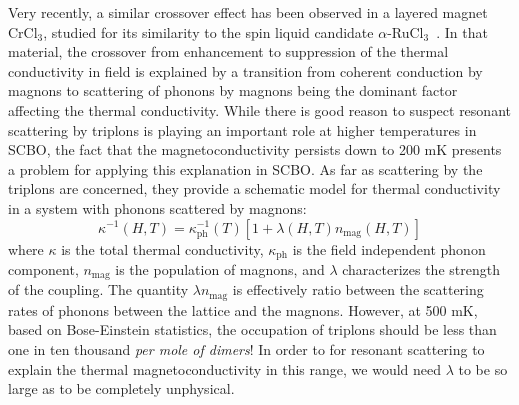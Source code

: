 \documentclass{thesis-umich}
\begin{document}
Very recently, a similar crossover effect has been observed in a layered magnet CrCl$_3$, studied for its similarity to the spin liquid candidate $\alpha$-RuCl$_3$~\cite{Pocs2019}. In that material, the crossover from enhancement to suppression of the thermal conductivity in field is explained by a transition from coherent conduction by magnons to scattering of phonons by magnons being the dominant factor affecting the thermal conductivity. While there is good reason to suspect resonant scattering by triplons is playing an important role at higher temperatures in SCBO, the fact that the magnetoconductivity persists down to 200 mK presents a problem for applying this explanation in SCBO. As far as scattering by the triplons are concerned, they provide a schematic model for thermal conductivity in a system with phonons scattered by magnons:
\[\kappa^{-1}(H,T) = \kappa^{-1}_{\mathrm{ph}}(T)[1 + \lambda(H,T)n_{\mathrm{mag}}(H,T)]\]
where $\kappa$ is the total thermal conductivity, $\kappa_{\mathrm{ph}}$ is the field independent phonon component, $n_{\mathrm{mag}}$ is the population of magnons, and $\lambda$ characterizes the strength of the coupling. The quantity $\lambda n_{\mathrm{mag}}$ is effectively ratio between the scattering rates of phonons between the lattice and the magnons. However, at 500 mK, based on Bose-Einstein statistics, the occupation of triplons should be less than one in ten thousand \textit{per mole of dimers}! In order to for resonant scattering to explain the thermal magnetoconductivity in this range, we would need $\lambda$ to be so large as to be completely unphysical. 
\end{document}
